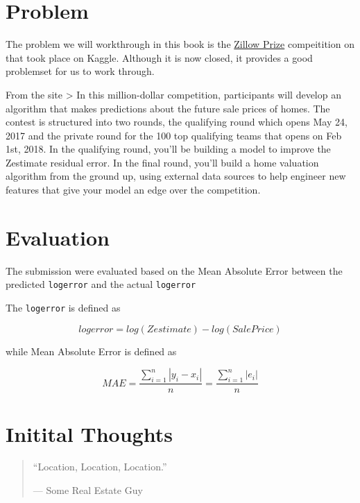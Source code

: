 \documentclass[]{book}
\theoremstyle{definition}
\theoremstyle{definition}
\theoremstyle{definition}
\theoremstyle{remark}
\begin{document}
\section{Problem}\label{problem}

The problem we will workthrough in this book is the
\href{https://www.kaggle.com/c/zillow-prize-1}{Zillow Prize}
compeitition on that took place on Kaggle. Although it is now closed, it
provides a good problemset for us to work through.

From the site \textgreater{} In this million-dollar competition,
participants will develop an algorithm that makes predictions about the
future sale prices of homes. The contest is structured into two rounds,
the qualifying round which opens May 24, 2017 and the private round for
the 100 top qualifying teams that opens on Feb 1st, 2018. In the
qualifying round, you'll be building a model to improve the Zestimate
residual error. In the final round, you'll build a home valuation
algorithm from the ground up, using external data sources to help
engineer new features that give your model an edge over the competition.

\section{Evaluation}\label{evaluation}

The submission were evaluated based on the Mean Absolute Error between
the predicted \texttt{logerror} and the actual \texttt{logerror}

The \texttt{logerror} is defined as

\begin{equation}
logerror = log(Zestimate) - log(SalePrice)
\label{eq:logerror}
\end{equation}

while Mean Absolute Error is defined as

\begin{equation}
MAE = \frac{{\sum_{i=1}^{n} |y_i - x_i|}}{n} = \frac{{\sum_{i=1}^{n} |e_i|}}{n}
\label{eq:mae}
\end{equation}

\section{Initital Thoughts}\label{initital-thoughts}

\begin{quote}
``Location, Location, Location.''

--- Some Real Estate Guy
\end{quote}
\end{document}
